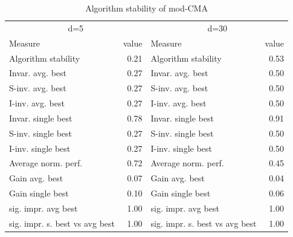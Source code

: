 \begin{table}
\caption{Algorithm stability of mod-CMA}
\begin{tabular}{lrlr}
\toprule
\multicolumn{2}{c}{d=5} & \multicolumn{2}{c}{d=30} \\
Measure & value & Measure & value \\
\midrule
Algorithm stability & 0.21 & Algorithm stability & 0.53 \\
Invar. avg. best & 0.27 & Invar. avg. best & 0.50 \\
S-inv. avg. best & 0.27 & S-inv. avg. best & 0.50 \\
I-inv. avg. best & 0.27 & I-inv. avg. best & 0.50 \\
Invar. single best & 0.78 & Invar. single best & 0.91 \\
S-inv. single best & 0.27 & S-inv. single best & 0.50 \\
I-inv. single best & 0.27 & I-inv. single best & 0.50 \\
Average norm. perf. & 0.72 & Average norm. perf. & 0.45 \\
Gain avg. best & 0.07 & Gain avg. best & 0.04 \\
Gain single best & 0.10 & Gain single best & 0.06 \\
sig. impr. avg best & 1.00 & sig. impr. avg best & 1.00 \\
sig. impr. s. best vs avg best & 1.00 & sig. impr. s. best vs avg best & 1.00 \\
\bottomrule
\end{tabular}
\end{table}
